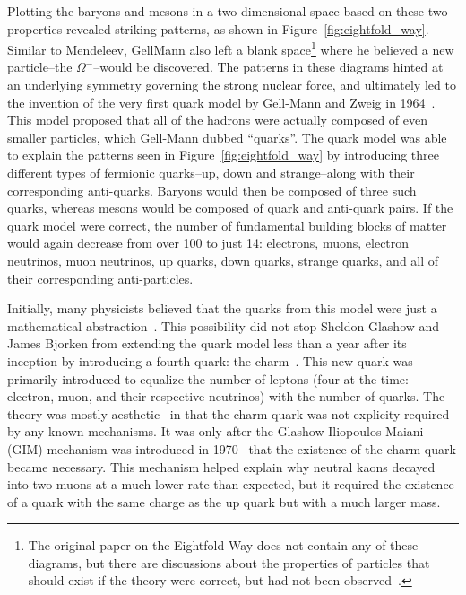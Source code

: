 Plotting the baryons and mesons in a two-dimensional space based on these two properties revealed striking patterns, as shown in Figure~\ref{fig:eightfold_way}. Similar to Mendeleev, GellMann also left a blank space\footnote{The original paper on the Eightfold Way does not contain any of these diagrams, but there are discussions about the properties of particles that should exist if the theory were correct, but had not been observed~\cite{GellMannEightfold}.} where he believed a new particle--the $\Omega^{-}$--would be discovered.  The patterns in these diagrams hinted at an underlying symmetry governing the strong nuclear force, and ultimately led to the invention of the very first quark model by Gell-Mann and Zweig in 1964~\cite{QuarkModel}. This model proposed that all of the hadrons were actually composed of even smaller particles, which Gell-Mann dubbed ``quarks''. The quark model was able to explain the patterns seen in Figure~\ref{fig:eightfold_way} by introducing three different types of fermionic quarks--up, down and strange--along with their corresponding anti-quarks. Baryons would then be composed of three such quarks, whereas mesons would be composed of quark and anti-quark pairs. If the quark model were correct, the number of fundamental building blocks of matter would again decrease from over 100 to just 14: electrons, muons, electron neutrinos, muon neutrinos, up quarks, down quarks, strange quarks, and all of their corresponding anti-particles.

Initially, many physicists believed that the quarks from this model were just a mathematical abstraction~\cite{QuarkAbstraction}. This possibility did not stop Sheldon Glashow and James Bjorken from extending the quark model less than a year after its inception by introducing a fourth quark: the charm~\cite{CharmQuark}. This new quark was primarily introduced to equalize the number of leptons (four at the time: electron, muon, and their respective neutrinos) with the number of quarks. The theory was mostly aesthetic~\cite{AestheticCharm} in that the charm quark was not explicity required by any known mechanisms. It was only after the Glashow-Iliopoulos-Maiani (GIM) mechanism was introduced in 1970~\cite{GIM} that the existence of the charm quark became necessary. This mechanism helped explain why neutral kaons decayed into two muons at a much lower rate than expected, but it required the existence of a quark with the same charge as the up quark but with a much larger mass.

